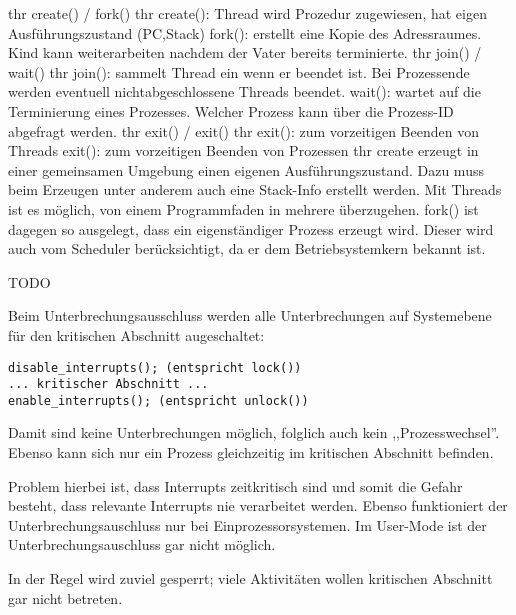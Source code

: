 \begin{answer}
thr create() / fork()
thr create():
Thread wird Prozedur zugewiesen, hat eigen Ausführungszustand (PC,Stack)
fork():
erstellt eine Kopie des Adressraumes. Kind kann weiterarbeiten nachdem der Vater bereits terminierte.
thr join() / wait()
thr join():
sammelt Thread ein wenn er beendet ist. Bei Prozessende werden eventuell nichtabgeschlossene
Threads beendet.
wait():
wartet auf die Terminierung eines Prozesses. Welcher Prozess kann über die Prozess-ID abgefragt
werden.
thr exit() / exit()
thr exit():
zum vorzeitigen Beenden von Threads
exit():
zum vorzeitigen Beenden von Prozessen
thr create erzeugt in einer gemeinsamen Umgebung einen eigenen Ausführungszustand. Dazu muss
beim Erzeugen unter anderem auch eine Stack-Info erstellt werden. Mit Threads ist es möglich,
von einem Programmfaden in mehrere überzugehen. fork() ist dagegen so ausgelegt, dass ein
eigenständiger Prozess erzeugt wird. Dieser wird auch vom Scheduler berücksichtigt, da er dem
Betriebsystemkern bekannt ist.
\end{answer}

\begin{answer}
TODO
\end{answer}

\begin{answer}
Beim Unterbrechungsausschluss werden alle Unterbrechungen auf Systemebene für den kritischen Abschnitt augeschaltet:

\begin{verbatim}
disable_interrupts(); (entspricht lock())
... kritischer Abschnitt ...
enable_interrupts(); (entspricht unlock())
\end{verbatim}

Damit sind keine Unterbrechungen möglich, folglich auch kein ,,Prozesswechsel''. Ebenso kann sich nur ein Prozess gleichzeitig im kritischen Abschnitt befinden.

Problem hierbei ist, dass Interrupts zeitkritisch sind und somit die Gefahr besteht, dass relevante Interrupts nie verarbeitet werden. Ebenso funktioniert der Unterbrechungsauschluss nur bei Einprozessorsystemen. Im User-Mode ist der Unterbrechungsauschluss gar nicht möglich.

In der Regel wird zuviel gesperrt; viele Aktivitäten wollen kritischen Abschnitt gar nicht betreten.
\end{answer}

